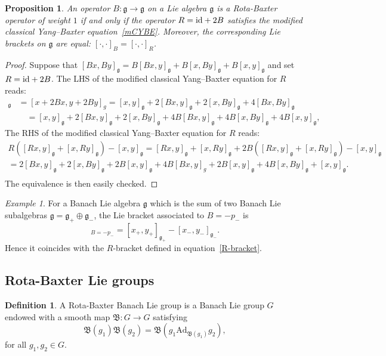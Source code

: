\documentclass[a4paper,12pt,reqno]{amsart}%
\newtheorem{proposition}[theorem]{Proposition}
\theoremstyle{definition}
\newtheorem{definition}[theorem]{Definition}
\theoremstyle{remark}
\newtheorem{example}[theorem]{Example}
\numberwithin{theorem}{section}
\numberwithin{equation}{section}
\newcommand{\1}{{\bf 1}}
\newcommand{\id}{{\rm id}}
\newcommand{\g}{{\mathfrak g}}
\begin{document}
\begin{proposition}
    An operator $B:\g\rightarrow \g$ on a Lie algebra $\g$ is a Rota-Baxter operator of weight $1$ if and only if the operator $R = \id + 2B$ satisfies the modified classical Yang--Baxter equation~\ref{mCYBE}. Moreover, the corresponding Lie brackets on $\g$ are equal: $[\cdot, \cdot]_B = [\cdot, \cdot]_R$.
\end{proposition}


\begin{proof}
 Suppose that $[Bx, By]_\g = B[Bx, y]_\g + B[x, By]_\g +  B[x, y]_\g$ and set $R = \id + 2B$. The LHS of the modified classical Yang--Baxter equation for $R$ reads:
\begin{align*}
[Rx, Ry]_\g & = [x + 2Bx, y + 2By]_g = [x, y]_\g + 2[Bx, y]_\g + 2[x, By]_\g + 4[Bx, By]_\g\\
&  \quad = [x, y]_\g + 2[Bx, y]_\g + 2[x, By]_\g+ 4B[Bx, y]_\g + 4B[x, By]_\g + 4B[x, y]_\g,
\end{align*}
  The RHS of the modified classical Yang--Baxter equation for $R$ reads:
\begin{align*}
R\left([Rx, y]_\g + [x, Ry]_\g\right) - [x, y]_\g  = [Rx, y]_\g + [x, Ry]_\g + 2B\left([Rx, y]_\g + [x, Ry]_\g\right) - [x, y]_\g\\
=  2[Bx, y]_\g  + 2[x, By]_\g + 2B[x, y]_\g + 4B[Bx, y]_g +2B[x, y]_\g + 4B[x, By]_\g + [x,y]_\g.\\
\end{align*}
The equivalence is then easily checked.
\end{proof}

\begin{example}
    For a Banach Lie algebra $\g$ which is the sum of two Banach Lie subalgebras $\g = \g_+\oplus \g_-$, the Lie bracket associated to $B = -p_-$ is 
    \begin{equation}
        [x, y]_{B = -p_-} = [x_+, y_+]_{\g_+} - [x_-, y_-]_{\g_-}.
    \end{equation}
    Hence it coincides with the $R$-bracket defined in equation~\eqref{R-bracket}.
\end{example}

\subsection{Rota-Baxter Lie groups}

\begin{definition}
    A Rota-Baxter Banach Lie group is a Banach Lie group $G$ endowed with a smooth map $\mathfrak{B}: G  \rightarrow G$ satisfying
    \begin{equation}
        \mathfrak{B}(g_1)\mathfrak{B}(g_2) = \mathfrak{B}\left(g_1 \textrm{Ad}_{\mathfrak{B}(g_1)}g_2\right),
    \end{equation}
    for all $g_1, g_2 \in G$.
\end{definition}
\end{document}
